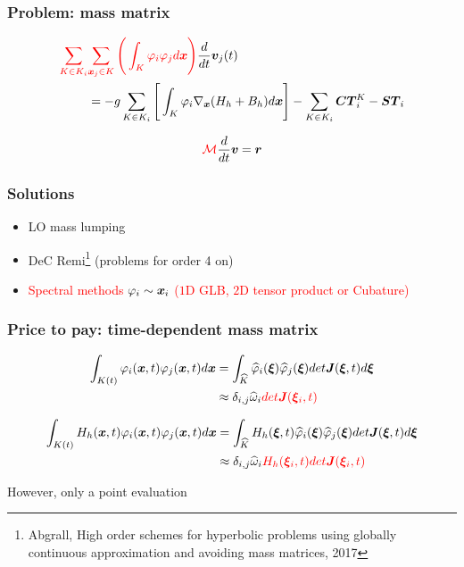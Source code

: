 \documentclass[pt12]{beamer}
\newcommand{\uvec}[2][3]{\boldsymbol{#2\mkern-#1mu}\mkern#1mu}
\newcommand{\hphi}[0]{\widehat{\varphi}}
\begin{document}
\begin{frame}
\frametitle{Problem: mass matrix}
\centering

\begin{align*}
\textcolor{red}{\sum_{K \in K_i}} & \textcolor{red}{\sum_{\uvec{x}_j \in K} \Bigg(\int_K \varphi_i \varphi_j d \uvec{x}\Bigg)} \frac{d}{dt}\uvec{v}_j(t)\\
&= -g \sum_{K \in K_i} \Bigg[ \int_K \varphi_i \nabla_{\uvec{x}}(H_h+B_h)  d\uvec{x}\Bigg] - \sum_{K \in K_i} \uvec{CT}_i^K -\uvec{ST}_i
\end{align*}


\begin{align*}
\textcolor{red}{\mathcal{M}}\frac{d}{dt}\uvec{v}=\uvec{r}
\end{align*}


\end{frame}



\begin{frame}
\frametitle{Solutions}

\begin{itemize}
\item LO mass lumping
\item DeC Remi\footnote{Abgrall, High order schemes for hyperbolic problems using globally continuous approximation and avoiding mass matrices, 2017} (problems for order 4 on)
\item \textcolor{red}{Spectral methods $\varphi_i \sim \uvec{x}_i$ ($1$D GLB, $2$D tensor product or Cubature)}
\end{itemize}

\end{frame}




\begin{frame}
\frametitle{Price to pay: time-dependent mass matrix}


\begin{align*}
\int_{K(t)} \varphi_i(\uvec{x},t)\varphi_j(\uvec{x},t)d\uvec{x}&=\int_{\widehat{K}} \hphi_i(\uvec{\xi})\hphi_j(\uvec{\xi}) det \uvec{J}(\uvec{\xi},t) d\uvec{\xi}\\
&\approx \delta_{i,j}\widehat{\omega}_i \textcolor{red}{det \uvec{J}(\uvec{\xi}_i,t)}
\end{align*}


\begin{align*}
\int_{K(t)}H_h(\uvec{x},t) \varphi_i(\uvec{x},t)\varphi_j(\uvec{x},t)d\uvec{x}&=\int_{\widehat{K}}H_h(\uvec{\xi},t) \hphi_i(\uvec{\xi})\hphi_j(\uvec{\xi}) det \uvec{J}(\uvec{\xi},t) d\uvec{\xi}\\
&\approx \delta_{i,j}\widehat{\omega}_i \textcolor{red}{ H_h(\uvec{\xi}_i,t) det \uvec{J}(\uvec{\xi}_i,t)}
\end{align*}

\centering 
However, only a point evaluation

\end{frame}
\end{document}
